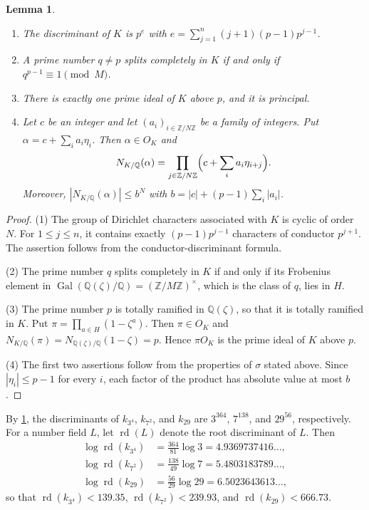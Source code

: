 \documentclass[11pt]{amsart}
\theoremstyle{plain}
\newtheorem{lemma}[theorem]{Lemma}
\theoremstyle{definition}
\begin{document}
\begin{lemma} \label{lem:field}
\begin{enumerate}
\item The discriminant of $K$ is $p^e$ with $e = \sum_{j=1}^{n} (j+1)(p-1)p^{j-1}$.
\item A prime number $q \ne p$ splits completely in $K$ if and only if $q^{p-1} \equiv 1 \pmod{M}$.
\item There is exactly one prime ideal of $K$ above $p$, and it is principal.
\item Let $c$ be an integer and let $(a_i)_{i \in \mathbb{Z}/N\mathbb{Z}}$ be a family of integers. Put $\alpha = c + \sum_i a_i \eta_i$. Then $\alpha \in O_K$ and
\[
N_{K/\mathbb{Q}}(\alpha) = \prod_{j \in \mathbb{Z}/N\mathbb{Z}} \Bigl( c + \sum_{i} a_i \eta_{i+j} \Bigr) .
\]
Moreover, $|N_{K/\mathbb{Q}}(\alpha)| \le b^N$ with $b = |c| + (p-1) \sum_i |a_i|$.
\end{enumerate}
\end{lemma}

\begin{proof}
(1) The group of Dirichlet characters associated with $K$ is cyclic of order $N$.
For $1 \le j \le n$, it contains exactly $(p-1)p^{j-1}$ characters of conductor $p^{j+1}$.
The assertion follows from the conductor-discriminant formula.

(2) The prime number $q$ splits completely in $K$ if and only if its Frobenius element in $\operatorname{Gal}(\mathbb{Q}(\zeta)/\mathbb{Q}) = (\mathbb{Z}/M\mathbb{Z})^\times$, which is the class of $q$, lies in $H$.

(3) The prime number $p$ is totally ramified in $\mathbb{Q}(\zeta)$, so that it is totally ramified in $K$.
Put $\pi = \prod_{a \in H} (1 - \zeta^a)$.
Then $\pi \in O_K$ and $N_{K/\mathbb{Q}}(\pi) = N_{\mathbb{Q}(\zeta)/\mathbb{Q}}(1 - \zeta) = p$.
Hence $\pi O_K$ is the prime ideal of $K$ above $p$.

(4) The first two assertions follow from the properties of $\sigma$ stated above.
Since $|\eta_i| \le p - 1$ for every $i$, each factor of the product has absolute value at most $b$.
\end{proof}

By \cref{lem:field}, the discriminants of $k_{3^4}$, $k_{7^2}$, and $k_{29}$ are $3^{364}$, $7^{138}$, and $29^{56}$, respectively.
For a number field $L$, let $\operatorname{rd}(L)$ denote the root discriminant of $L$.
Then
\begin{align*}
\log \operatorname{rd}(k_{3^4}) &= \tfrac{364}{81} \log 3 = 4.9369737416\ldots, \\
\log \operatorname{rd}(k_{7^2}) &= \tfrac{138}{49} \log 7 = 5.4803183789\ldots, \\
\log \operatorname{rd}(k_{29}) &= \tfrac{56}{29} \log 29 = 6.5023643613\ldots,
\end{align*}
so that $\operatorname{rd}(k_{3^4}) < 139.35$, $\operatorname{rd}(k_{7^2}) < 239.93$, and $\operatorname{rd}(k_{29}) < 666.73$.
\end{document}
